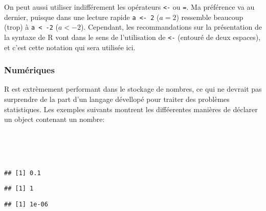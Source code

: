 On peut aussi utiliser indifférement les opérateurs \texttt{<-} ou \texttt{=}.
Ma préférence va au dernier, puisque dans une lecture rapide \texttt{a <- 2} ($a = 2$) ressemble beaucoup (trop) à \texttt{a < -2} ($a < -2$).
Cependant, les recommandations sur la présentation de la syntaxe de R vont dans le sens de l'utilisation de \texttt{<-} (entouré de deux espaces), et c'est cette notation qui sera utilisée ici.

\subsubsection{Numériques}

R est extrèmement performant dans le stockage de nombres, ce qui ne devrait pas surprendre de la part d'un langage dévellopé pour traiter des problèmes statistiques.
Les exemples suivants montrent les difféerentes manières de déclarer un object contenant un nombre:

\begin{knitrout}
\color{fgcolor}\begin{kframe}
\begin{flushleft}
\ttfamily\noindent
{}\hlassignement{\usebox{\hlnormalsizeboxlessthan}-}{\ }\hspace*{\fill}\\
\hlstd{}\hlassignement{\usebox{\hlnormalsizeboxlessthan}-}{\ }\hspace*{\fill}\\
\hlstd{}\hlassignement{\usebox{\hlnormalsizeboxlessthan}-}{\ }\hspace*{\fill}\\
\hlstd{}\mbox{}
\normalfont
\end{flushleft}
\begin{verbatim}
## [1] 0.1
\end{verbatim}
\begin{flushleft}
\ttfamily\noindent
{}\mbox{}
\normalfont
\end{flushleft}
\begin{verbatim}
## [1] 1
\end{verbatim}
\begin{flushleft}
\ttfamily\noindent
{}\mbox{}
\normalfont
\end{flushleft}
\begin{verbatim}
## [1] 1e-06
\end{verbatim}
\end{kframe}
\end{knitrout}



